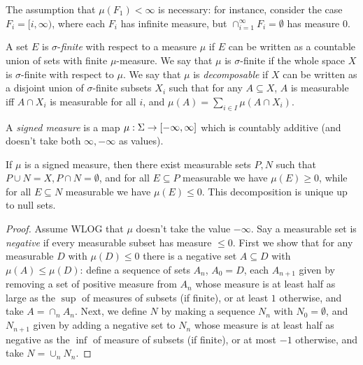 \begin{ex} The assumption that $\mu(F_1) < \infty$ is necessary: for instance, consider the case $F_i = [i,\infty)$, where each $F_i$ has infinite measure, but $\cap_{i=1}^\infty F_i = \emptyset$ has measure $0$.
\end{ex}

\begin{defn} A set $E$ is $\sigma$-\emph{finite} with respect to a measure $\mu$ if $E$ can be written as a countable union of sets with finite $\mu$-measure. We say that $\mu$ is $\sigma$-finite if the whole space $X$ is $\sigma$-finite with respect to $\mu$. We say that $\mu$ is \emph{decomposable} if $X$ can be written as a disjoint union of $\sigma$-finite subsets $X_i$ such that for any $A \subseteq X$, $A$ is measurable iff $A \cap X_i$ is measurable for all $i$, and $\mu(A) = \sum_{i \in I} \mu(A\cap X_i)$.
\end{defn}

\begin{defn} A \emph{signed measure} is a map $\mu:\Sigma \rightarrow [-\infty,\infty]$ which is countably additive (and doesn't take both $\infty, -\infty$ as values).
\end{defn}

\begin{thm}\label{hahn-decomposition} If $\mu$ is a signed measure, then there exist measurable sets $P,N$ such that $P\cup N = X, P \cap N = \emptyset$, and for all $E \subseteq P$ measurable we have $\mu(E) \ge 0$, while for all $E \subseteq N$ measurable we have $\mu(E) \le 0$. This decomposition is unique up to null sets.
\end{thm}
\begin{proof} Assume WLOG that $\mu$ doesn't take the value $-\infty$. Say a measurable set is \emph{negative} if every measurable subset has measure $\le 0$. First we show that for any measurable $D$ with $\mu(D) \le 0$ there is a negative set $A \subseteq D$ with $\mu(A) \le \mu(D)$: define a sequence of sets $A_n$, $A_0 = D$, each $A_{n+1}$ given by removing a set of positive measure from $A_n$ whose measure is at least half as large as the $\sup$ of measures of subsets (if finite), or at least $1$ otherwise, and take $A = \cap_n A_n$. Next, we define $N$ by making a sequence $N_n$ with $N_0 = \emptyset$, and $N_{n+1}$ given by adding a negative set to $N_n$ whose measure is at least half as negative as the $\inf$ of measure of subsets (if finite), or at most $-1$ otherwise, and take $N = \cup_n N_n$.
\end{proof}

